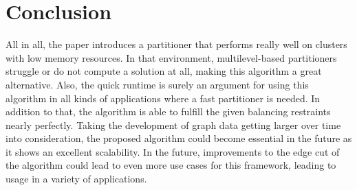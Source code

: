 \documentclass[acmsmall,nonacm,screen,review]{acmart}
\begin{document}
\section{Conclusion}
All in all, the paper introduces a partitioner that performs really well on clusters with low memory resources. In that environment, multilevel-based partitioners struggle or do not compute a solution at all, making this algorithm a great alternative. Also, the quick runtime is surely an argument for using this algorithm in all kinds of applications where a fast partitioner is needed. In addition to that, the algorithm is able to fulfill the given balancing restraints nearly perfectly. Taking the development of graph data getting larger over time into consideration, the proposed algorithm could become essential in the future as it shows an excellent scalability.  In the future, improvements to the edge cut of the algorithm could lead to even more use cases for this framework, leading to usage in a variety of applications.


\end{document}
